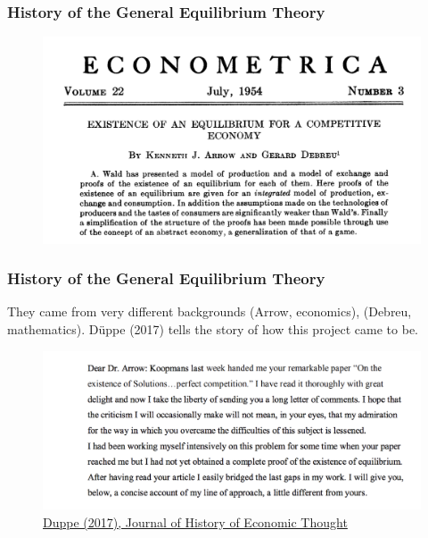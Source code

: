 \documentclass[handout]{beamer}
\begin{document}
\begin{frame}\frametitle{History of the General Equilibrium Theory}

\begin{figure}
\centering
\includegraphics[scale=0.5]{ad1954.png}
\end{figure}

\end{frame}


\begin{frame}\frametitle{History of the General Equilibrium Theory}

They came from very different backgrounds (Arrow, economics), (Debreu, mathematics). Düppe (2017) tells the story of how this project came to be.  

\begin{figure}
\centering
\includegraphics[scale=0.35]{invitation.png}
\caption{\href{https://www.cambridge.org/core/journals/journal-of-the-history-of-economic-thought/article/div-classtitlearrow-and-debreu-de-homogenizeddiv/761E76D5A52C948615066F502277D9DD}{Duppe (2017), Journal of History of Economic Thought}}
\end{figure}

\end{frame}
\end{document}
